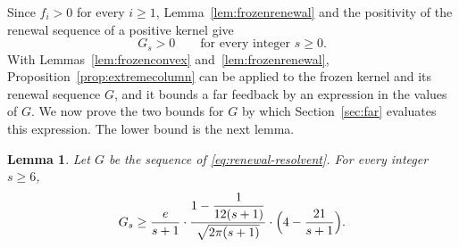 \documentclass{amsart}
\newtheorem{lemma}[theorem]{Lemma}
\theoremstyle{definition}
\theoremstyle{remark}
\numberwithin{equation}{section}
\begin{document}
Since $f_i>0$ for every $i\ge1$, Lemma~\ref{lem:frozenrenewal} and the
positivity of the renewal sequence of a positive kernel give
\begin{equation}\label{eq:renewal-positive}
G_s>0\qquad\text{for every integer } s\ge0 .
\end{equation}
With Lemmas~\ref{lem:frozenconvex} and~\ref{lem:frozenrenewal},
Proposition~\ref{prop:extremecolumn} can be applied to the frozen kernel
and its renewal sequence $G$, and it bounds a far feedback by an expression
in the values of $G$. We now prove the two bounds for $G$ by which
Section~\ref{sec:far} evaluates this expression. The lower bound is the next
lemma.

\begin{lemma}\label{lem:resolventlower}
Let $G$ be the sequence of \eqref{eq:renewal-resolvent}. For every integer
$s\ge6$,
\[
G_s\ge \frac{e}{s+1}\cdot
\frac{1-\dfrac{1}{12(s+1)}}{\sqrt{2\pi(s+1)}}\cdot
\Bigl(4-\frac{21}{s+1}\Bigr).
\]
\end{lemma}
\end{document}

